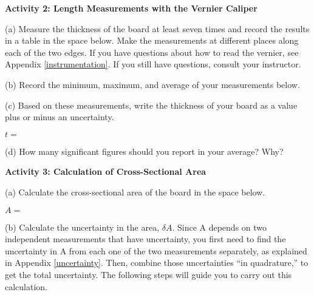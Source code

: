 \textbf{Activity 2: Length Measurements with the Vernier Caliper }

(a) Measure the thickness of the board at least seven times and record the results
in a table in the space below. Make the measurements at different places along
each of the two edges. If you have questions about how to read the vernier,
see Appendix \ref{instrumentation}. If you still have questions, consult your instructor.
\vspace{35mm}

\newpage
(b) Record the minimum, maximum, and average of your measurements below.
\vspace{20mm}


(c) Based on these measurements, write the thickness of your board as a value plus or minus an uncertainty.

\vspace{4mm}
\hspace {45mm} $t =$
\vspace{3mm}

(d) How many significant figures should you report in your average? Why? 
\vspace{25mm}

\textbf{Activity 3: Calculation of Cross-Sectional Area} 

(a) Calculate the cross-sectional area of the board in the space below.

\vspace{4mm}
\hspace {30mm} $A =$
\vspace{3mm}

(b) Calculate the uncertainty in the area, \( \delta  A\).
Since A depends on two independent measurements that have uncertainty, you first need to find the uncertainty in A from each one of the two measurements separately, as explained in Appendix \ref{uncertainty}. Then, combine those uncertainties ``in quadrature,'' to get the total uncertainty. The following steps will guide you to carry out this calculation.


